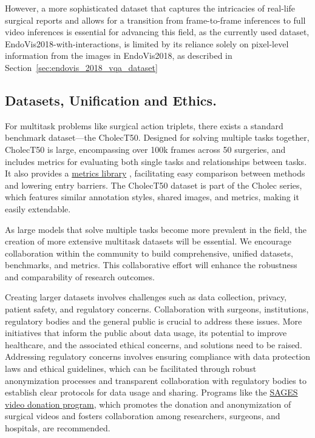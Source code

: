 \documentclass[times,twocolumn,final]{elsarticle}
\newcommand{\secref}[1]{Section~\ref{#1}}
\begin{document}
However, a more sophisticated dataset that captures the intricacies of real-life surgical reports and allows for a transition from frame-to-frame inferences to full video inferences is essential for advancing this field, as the currently used dataset, EndoVis2018-with-interactions, is limited by its reliance solely on pixel-level information from the images in EndoVis2018, as described in \secref{sec:endovis_2018_vqa_dataset}


\subsection{Datasets, Unification and Ethics.}
For multitask problems like surgical action triplets, there exists a standard benchmark dataset—the CholecT50. Designed for solving multiple tasks together, CholecT50 is large, encompassing over 100k frames across 50 surgeries, and includes metrics for evaluating both single tasks and relationships between tasks. It also provides a  \href{https://github.com/CAMMA-public/ivtmetrics}{metrics library} , facilitating easy comparison between methods and lowering entry barriers. The CholecT50 dataset is part of the Cholec series, which features similar annotation styles, shared images, and metrics, making it easily extendable.

As large models that solve multiple tasks become more prevalent in the field, the creation of more extensive multitask datasets will be essential. We encourage collaboration within the community to build comprehensive, unified datasets, benchmarks, and metrics. This collaborative effort will enhance the robustness and comparability of research outcomes.

Creating larger datasets involves challenges such as data collection, privacy, patient safety, and regulatory concerns.  Collaboration with surgeons, institutions, regulatory bodies and the general public is crucial to address these issues. More initiatives that inform the public about data usage, its potential to improve healthcare, and the associated ethical concerns, and solutions need to be raised. Addressing regulatory concerns involves ensuring compliance with data protection laws and ethical guidelines, which can be facilitated through robust anonymization processes and transparent collaboration with regulatory bodies to establish clear protocols for data usage and sharing.  Programs like the \href{https://www.cvschallenge.org/data-donation-video}{SAGES video donation program}, which promotes the donation and anonymization of surgical videos and fosters collaboration among researchers, surgeons, and hospitals, are recommended.
\end{document}
